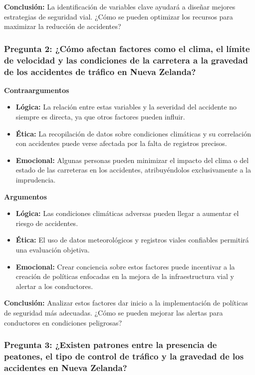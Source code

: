 \documentclass{book}
\begin{document}
\textbf{Conclusión:} La identificación de variables clave ayudará a diseñar mejores estrategias de seguridad vial. ¿Cómo se pueden optimizar los recursos para maximizar la reducción de accidentes?

\subsubsection{Pregunta 2: ¿Cómo afectan factores como el clima, el límite de velocidad y las condiciones de la carretera a la gravedad de los accidentes de tráfico en Nueva Zelanda?}

\textbf{Contraargumentos}
\begin{itemize}
    \item \textbf{Lógica:} La relación entre estas variables y la severidad del accidente no siempre es directa, ya que otros factores pueden influir.
    \item \textbf{Ética:} La recopilación de datos sobre condiciones climáticas y su correlación con accidentes puede verse afectada por la falta de registros precisos.
    \item \textbf{Emocional:} Algunas personas pueden minimizar el impacto del clima o del estado de las carreteras en los accidentes, atribuyéndolos exclusivamente a la imprudencia.
\end{itemize}

\textbf{Argumentos}
\begin{itemize}
    \item \textbf{Lógica:} Las condiciones climáticas adversas pueden llegar a aumentar el riesgo de accidentes.
    \item \textbf{Ética:} El uso de datos meteorológicos y registros viales confiables permitirá una evaluación objetiva.
    \item \textbf{Emocional:} Crear conciencia sobre estos factores puede incentivar a la creación de políticas enfocadas en la mejora de la infraestructura vial y alertar a los conductores.
\end{itemize}

\textbf{Conclusión:} Analizar estos factores dar inicio a la implementación de políticas de seguridad más adecuadas. ¿Cómo se pueden mejorar las alertas para conductores en condiciones peligrosas?

\subsubsection{Pregunta 3: ¿Existen patrones entre la presencia de peatones, el tipo de control de tráfico y la gravedad de los accidentes en Nueva Zelanda?}
\end{document}
